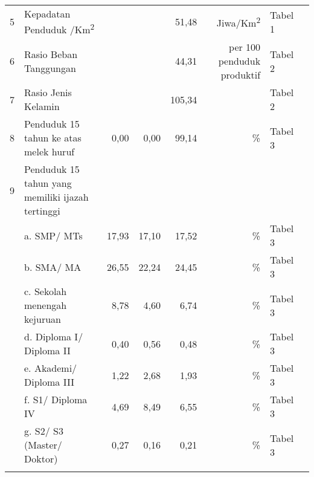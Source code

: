 \begin{small}
\begin{longtable}{rY{12em}rrrrY{5em}Y{5em}}
	  5 & Kepadatan Penduduk /Km\textsuperscript{2}                                   &                &        &        51,48 & Jiwa/Km\textsuperscript{2}     & Tabel 1  \\
	  6 & Rasio Beban Tanggungan                                                      &                &        &        44,31 & per 100 penduduk produktif     & Tabel 2  \\
	  7 & Rasio Jenis Kelamin                                                         &                &        &       105,34 &                                & Tabel 2  \\
	  8 & Penduduk 15 tahun ke atas melek huruf                                       &           0,00 &   0,00 &        99,14 & \%                             & Tabel 3  \\
	  9 & Penduduk 15 tahun yang memiliki ijazah tertinggi                            &                &        &              &                                &          \\
		& a. SMP/ MTs                                                                 &          17,93 &  17,10 &        17,52 & \%                             & Tabel 3  \\
		& b. SMA/ MA                                                                  &          26,55 &  22,24 &        24,45 & \%                             & Tabel 3  \\
		& c. Sekolah menengah kejuruan                                                &           8,78 &   4,60 &         6,74 & \%                             & Tabel 3  \\
		& d. Diploma I/ Diploma II                                                    &           0,40 &   0,56 &         0,48 & \%                             & Tabel 3  \\
		& e. Akademi/ Diploma III                                                     &           1,22 &   2,68 &         1,93 & \%                             & Tabel 3  \\
		& f. S1/ Diploma IV                                                           &           4,69 &   8,49 &         6,55 & \%                             & Tabel 3  \\
		& g. S2/ S3 (Master/ Doktor)                                                  &           0,27 &   0,16 &         0,21 & \%                             & Tabel 3  \\
	    &                                                                             &        &        &                    &          &                                &          \\ 

\end{longtable}
\end{small}
